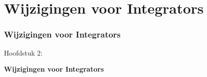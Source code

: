 %

\section{Wijzigingen voor Integrators}
\begin{frame}[fragile]
	\frametitle{Wijzigingen voor Integrators}

	\begin{center}\huge{Hoofdstuk 2:}\end{center}
	\begin{center}\huge{\color{typo3darkgrey}\textbf{Wijzigingen voor Integrators}}\end{center}

\end{frame}

